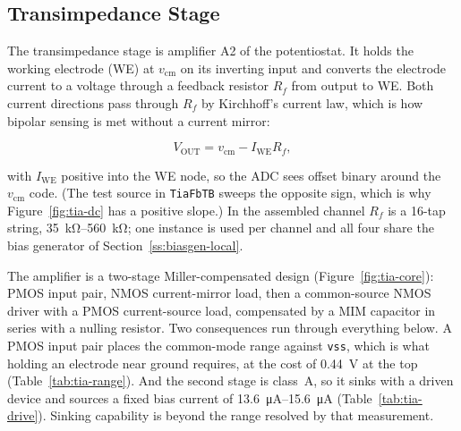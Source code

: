 %
%
%

\subsection{Transimpedance Stage}\label{ss:tiaamp}

The transimpedance stage is amplifier A2 of the potentiostat. It holds the working
electrode (WE) at $v_{\mathrm{cm}}$ on its inverting input and converts the electrode
current to a voltage through a feedback resistor $R_f$ from output to WE. Both current
directions pass through $R_f$ by Kirchhoff's current law, which is how bipolar sensing
is met without a current mirror:

\begin{equation}\label{eq:tia-transfer}
  V_{\mathrm{OUT}} = v_{\mathrm{cm}} - I_{\mathrm{WE}} R_f ,
\end{equation}

with $I_{\mathrm{WE}}$ positive into the WE node, so the ADC sees offset binary around
the $v_{\mathrm{cm}}$ code. (The test source in \texttt{TiaFbTB} sweeps the opposite
sign, which is why Figure~\ref{fig:tia-dc} has a positive slope.) In the assembled
channel $R_f$ is a 16-tap string, \SIrange{35}{560}{\kilo\ohm}; one instance is used per
channel and all four share the bias generator of Section~\ref{ss:biasgen-local}.

The amplifier is a two-stage Miller-compensated design (Figure~\ref{fig:tia-core}):
PMOS input pair, NMOS current-mirror load, then a common-source NMOS driver with a PMOS
current-source load, compensated by a MIM capacitor in series with a nulling resistor.
Two consequences run through everything below. A PMOS input pair places the common-mode
range against \texttt{vss}, which is what holding an electrode near ground requires, at
the cost of \SI{0.44}{\volt} at the top (Table~\ref{tab:tia-range}). And the second
stage is class~A, so it sinks with a driven device and sources a fixed bias
current of \SIrange{13.6}{15.6}{\micro\ampere} (Table~\ref{tab:tia-drive}). Sinking
capability is beyond the range resolved by that measurement.

